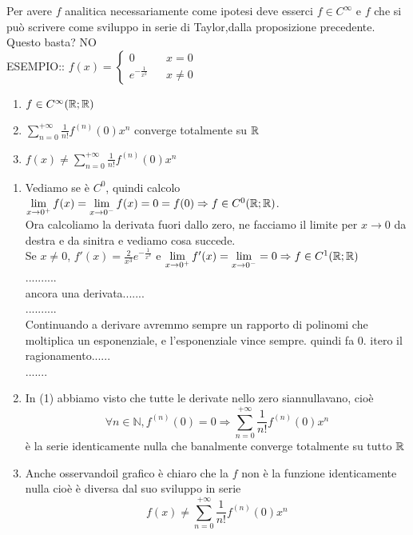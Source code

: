 Per avere $f$ analitica  necessariamente come ipotesi deve esserci $f\in C^{\infty}$ e $f$ che si può scrivere come sviluppo in serie di Taylor,dalla proposizione precedente. Questo basta? NO\\
ESEMPIO:: $f(x)=\left\{\begin{matrix}0&& x=0\\e^{-\frac{1}{x^2}}&&x\ne 0\end{matrix}\right.$\\
\begin{center}
	\begin{tikzpicture}[scale=1]
	\end{tikzpicture}
\end{center}
\begin{enumerate}
	\item $f\in C^{\infty}( \R; \R)$
	\item $\sum\limits_{n=0}^{+\infty}\frac{1}{n!}f^{(n)}(0)x^n$ converge totalmente su $ \R$
	\item $f(x)\ne\sum\limits_{n=0}^{+\infty}\frac{1}{n!}f^{(n)}(0)x^n$
\end{enumerate}
\begin{enumerate}
	\item Vediamo se è $C^0$, quindi calcolo $\lim\limits_{x\to 0^{+}}f(x)=\lim\limits_{x\to 0^{-}}f(x)=0=f(0)\Rightarrow f\in C^0( \R; \R)$.\\
	Ora calcoliamo la derivata fuori dallo zero, ne facciamo il limite per $x\to 0$ da destra e da sinitra e vediamo cosa succede.\\
	Se $x\ne 0$, $f'(x)=\frac{2}{x^3}e^{-\frac{1}{x^3}}$ e $\lim\limits_{x\to 0^{+}}f'(x)=\lim\limits_{x\to 0^{-}} = 0\Rightarrow f\in C^1( \R; \R)$\\
	..........\\
	ancora una derivata.......\\
	..........\\
	Continuando a derivare  avremmo sempre un rapporto di polinomi che moltiplica un esponenziale, e l'esponenziale vince sempre. quindi fa $0$.
	itero il ragionamento......\\
	.......\\
	\item In (1) abbiamo visto  che tutte le derivate nello zero siannullavano, cioè 
	$$\forall n\in\mathbb{N}, f^{(n)}(0)=0\Rightarrow \sum\limits_{n=0}^{+\infty}\frac{1}{n!}f^{(n)}(0)x^n$$
	è la serie identicamente nulla  che banalmente converge totalmente su tutto $ \R$
	\item Anche osservandoil grafico è chiaro che la $f$ non è la funzione identicamente nulla cioè è diversa dal suo sviluppo in serie
	$$f(x)\ne\sum\limits_{n=0}^{+\infty}\frac{1}{n!}f^{(n)}(0)x^n$$
\end{enumerate}
